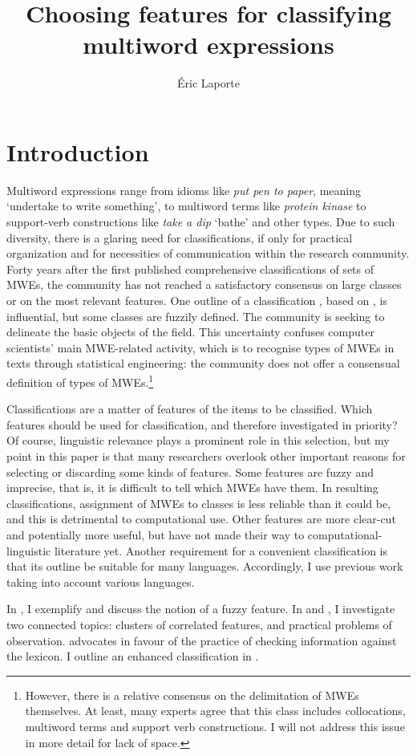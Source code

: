 \documentclass[output=paper]{langsci/langscibook}
\author{Éric Laporte\affiliation{Université Paris-Est, Laboratoire d’informatique Gaspard-Monge CNRS,
France}}
\title{Choosing features for classifying multiword expressions}
\begin{document}
\section{Introduction}
\largerpage[-2]
Multiword expressions range from idioms like \textit{put pen to paper}, meaning ‘undertake to write something’, to multiword terms like \textit{protein kinase} to support-verb constructions like \textit{take a dip} ‘bathe’ and other types. Due to such diversity, there is a glaring need for classifications, if only for practical organization and for necessities of communication within the research community. Forty years after the first published comprehensive classifications of sets of MWEs, the community has not reached a satisfactory consensus on large classes or on the most relevant features. One outline of a classification \citep{Sag:2002}, based on \cite{Nunberg1994}, is influential, but some classes are fuzzily defined. The community is seeking to delineate the basic objects of the field. This uncertainty confuses computer scientists’ main MWE-related activity, which is to recognise types of MWEs in texts through statistical engineering: the community does not offer a consensual definition of types of MWEs.\footnote{However, there is a relative consensus on the delimitation of MWEs themselves. At least, many experts agree that this class includes collocations, multiword terms and support verb constructions. I will not address this issue in more detail for lack of space.}

Classifications are a matter of features of the items to be classified. Which features should be used for classification, and therefore investigated in priority? Of course, linguistic relevance plays a prominent role in this selection, but my point in this paper is that many researchers overlook other important reasons for selecting or discarding some kinds of features. Some features are fuzzy and imprecise, that is, it is difficult to tell which MWEs have them. In resulting classifications, assignment of MWEs to classes is less reliable than it could be, and this is detrimental to computational use. Other features are more clear-cut and potentially more useful, but have not made their way to computational-linguistic literature yet. Another requirement for a convenient classification is that its outline be suitable for many languages. Accordingly, I use previous work taking into account various languages.

In , I exemplify and discuss the notion of a fuzzy feature. In   and , I investigate two connected topics: clusters of correlated features, and practical problems of observation.  advocates in favour of the practice of checking information against the lexicon. I outline an enhanced classification in .
\end{document}
